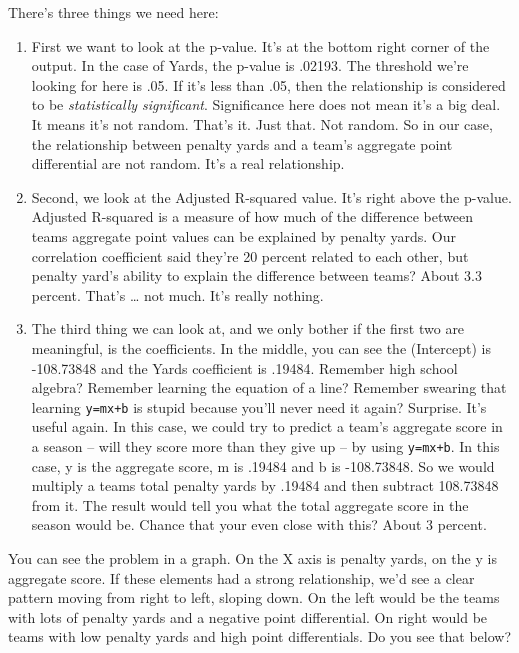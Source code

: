 \documentclass[]{book}
\providecommand{\tightlist}{%
  \setlength{\itemsep}{0pt}\setlength{\parskip}{0pt}}
\begin{document}
There's three things we need here:

\begin{enumerate}
\def\labelenumi{\arabic{enumi}.}
\tightlist
\item
  First we want to look at the p-value. It's at the bottom right corner of the output. In the case of Yards, the p-value is .02193. The threshold we're looking for here is .05. If it's less than .05, then the relationship is considered to be \emph{statistically significant}. Significance here does not mean it's a big deal. It means it's not random. That's it. Just that. Not random. So in our case, the relationship between penalty yards and a team's aggregate point differential are not random. It's a real relationship.
\item
  Second, we look at the Adjusted R-squared value. It's right above the p-value. Adjusted R-squared is a measure of how much of the difference between teams aggregate point values can be explained by penalty yards. Our correlation coefficient said they're 20 percent related to each other, but penalty yard's ability to explain the difference between teams? About 3.3 percent. That's \ldots{} not much. It's really nothing.
\item
  The third thing we can look at, and we only bother if the first two are meaningful, is the coefficients. In the middle, you can see the (Intercept) is -108.73848 and the Yards coefficient is .19484. Remember high school algebra? Remember learning the equation of a line? Remember swearing that learning \texttt{y=mx+b} is stupid because you'll never need it again? Surprise. It's useful again. In this case, we could try to predict a team's aggregate score in a season -- will they score more than they give up -- by using \texttt{y=mx+b}. In this case, y is the aggregate score, m is .19484 and b is -108.73848. So we would multiply a teams total penalty yards by .19484 and then subtract 108.73848 from it. The result would tell you what the total aggregate score in the season would be. Chance that your even close with this? About 3 percent.
\end{enumerate}

You can see the problem in a graph. On the X axis is penalty yards, on the y is aggregate score. If these elements had a strong relationship, we'd see a clear pattern moving from right to left, sloping down. On the left would be the teams with lots of penalty yards and a negative point differential. On right would be teams with low penalty yards and high point differentials. Do you see that below?
\end{document}
